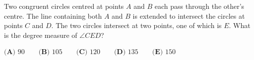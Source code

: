 Two congruent circles centred at points $A$ and $B$ each pass through the other's centre. The line containing both $A$ and $B$ is extended to intersect the circles at points $C$ and $D$. The two circles intersect at two points, one of which is $E$. What is the degree measure of $\angle CED$?

$\textbf{(A) }90\qquad\textbf{(B) }105\qquad\textbf{(C) }120\qquad\textbf{(D) }135\qquad\textbf{(E) }150$
